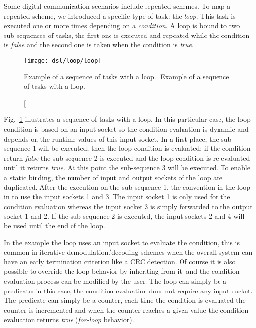 Some digital communication scenarios include repeated schemes. To map a repeated
scheme, we introduced a specific type of task: the \emph{loop}. This task is
executed one or more times depending on a \emph{condition}. A loop is bound to
two sub-sequences of tasks, the first one is executed and repeated while the
condition is \emph{false} and the second one is taken when the condition is
\emph{true}.

\begin{figure}[htp]
  \centering
  \texttt{[image: dsl/loop/loop]}
  \caption
    [Example of a sequence of tasks with a loop.]
    {Example of a sequence of tasks with a loop.}
  \label{fig:dsl_loop}
\end{figure}

Fig.~\ref{fig:dsl_loop} illustrates a sequence of tasks with a loop. In this
particular case, the loop condition is based on an input socket so the condition
evaluation is dynamic and depends on the runtime values of this input socket.
In a first place, the sub-sequence 1 will be executed; then the loop condition
is evaluated; if the condition return \emph{false} the sub-sequence 2 is
executed and the loop condition is re-evaluated until it returns \emph{true}. At
this point the sub-sequence 3 will be executed. To enable a static binding, the
number of input and output sockets of the loop are duplicated. After the
execution on the sub-sequence 1, the convention in the loop in to use the input
sockets 1 and 3. The input socket 1 is only used for the condition evaluation
whereas the input socket 3 is simply forwarded to the output socket 1 and 2. If
the sub-sequence 2 is executed, the input sockets 2 and 4 will be used until the
end of the loop.

In the example the loop uses an input socket to evaluate the condition, this is
common in iterative demodulation/decoding schemes when the overall system can
have an early termination criterion like a CRC detection. Of course it is also
possible to override the loop behavior by inheriting from it, and the condition
evaluation process can be modified by the user. The loop can simply be a
predicate: in this case, the condition evaluation does not require any input
socket. The predicate can simply be a counter, each time the condition is
evaluated the counter is incremented and when the counter reaches a given value
the condition evaluation returns \emph{true} (\emph{for-loop} behavior).

